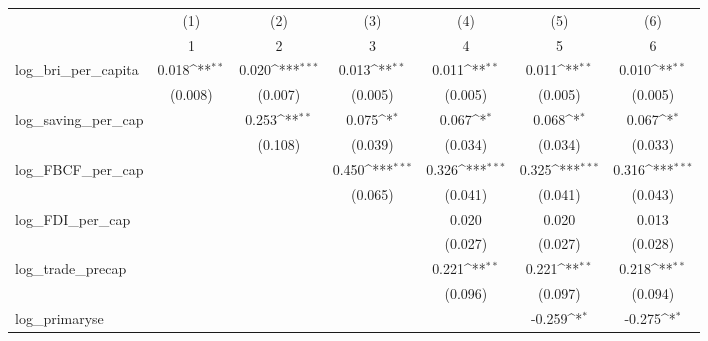 {
\def\sym#1{\ifmmode^{#1}\else\(^{#1}\)\fi}
\begin{tabular}{l*{6}{c}}
\toprule
            &\multicolumn{1}{c}{(1)}&\multicolumn{1}{c}{(2)}&\multicolumn{1}{c}{(3)}&\multicolumn{1}{c}{(4)}&\multicolumn{1}{c}{(5)}&\multicolumn{1}{c}{(6)}\\
            &\multicolumn{1}{c}{1}&\multicolumn{1}{c}{2}&\multicolumn{1}{c}{3}&\multicolumn{1}{c}{4}&\multicolumn{1}{c}{5}&\multicolumn{1}{c}{6}\\
\midrule
log\_bri\_per\_capita&       0.018\sym{**} &       0.020\sym{***}&       0.013\sym{**} &       0.011\sym{**} &       0.011\sym{**} &       0.010\sym{**} \\
            &     (0.008)         &     (0.007)         &     (0.005)         &     (0.005)         &     (0.005)         &     (0.005)         \\
\addlinespace
log\_saving\_per\_cap&                     &       0.253\sym{**} &       0.075\sym{*}  &       0.067\sym{*}  &       0.068\sym{*}  &       0.067\sym{*}  \\
            &                     &     (0.108)         &     (0.039)         &     (0.034)         &     (0.034)         &     (0.033)         \\
\addlinespace
log\_FBCF\_per\_cap&                     &                     &       0.450\sym{***}&       0.326\sym{***}&       0.325\sym{***}&       0.316\sym{***}\\
            &                     &                     &     (0.065)         &     (0.041)         &     (0.041)         &     (0.043)         \\
\addlinespace
log\_FDI\_per\_cap&                     &                     &                     &       0.020         &       0.020         &       0.013         \\
            &                     &                     &                     &     (0.027)         &     (0.027)         &     (0.028)         \\
\addlinespace
log\_trade\_precap&                     &                     &                     &       0.221\sym{**} &       0.221\sym{**} &       0.218\sym{**} \\
            &                     &                     &                     &     (0.096)         &     (0.097)         &     (0.094)         \\
\addlinespace
log\_primaryse&                     &                     &                     &                     &      -0.259\sym{*}  &      -0.275\sym{*}  \\

\end{tabular}}
